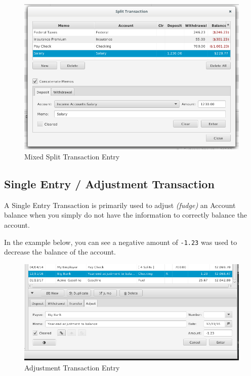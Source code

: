 \documentclass[letterpaper,12pt]{book}
\begin{document}
    \begin{figure}[h]
        \caption{Mixed Split Transaction Entry}
        \includegraphics[width=1.0\linewidth]{images/mixedSplitTransaction}
    \end{figure}

    \newpage
    \subsection{Single Entry / Adjustment Transaction}\label{subsec:single-entry-/-adjustment-transaction}
    A Single Entry Transaction is primarily used to adjust \textit{(fudge)} an Account balance when you simply do not
    have the information to correctly balance the account.

    In the example below, you can see a negative amount of \texttt{-1.23} was used to decrease the balance of the account.

    \begin{figure}[h]
        \caption{Adjustment Transaction Entry}
        \includegraphics[width=1.0\linewidth]{images/adjustmentTransaction}
    \end{figure}
\end{document}
